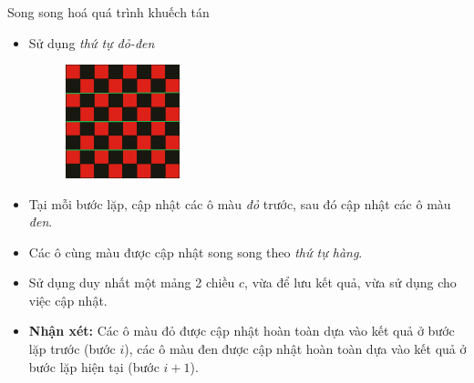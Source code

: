 \begin{frame}{Song song hoá quá trình khuếch tán}
\begin{itemize}
    \item Sử dụng \emph{thứ tự đỏ-đen}
    \begin{figure}[H]
        \centering
        \includegraphics[width=33mm]{img/red-black-grid.png}
    \end{figure}
	\item Tại mỗi bước lặp, cập nhật các ô màu \emph{đỏ} trước, sau đó cập nhật các ô màu \emph{đen}.
	\item Các ô cùng màu được cập nhật song song theo \emph{thứ tự hàng}.
	\item Sử dụng duy nhất một mảng 2 chiều $c$, vừa để lưu kết quả, vừa sử dụng cho việc cập nhật.
	\item \textbf{Nhận xét:} Các ô màu đỏ được cập nhật hoàn toàn dựa vào kết quả ở bước lặp trước (bước $i$), các ô màu đen được cập nhật hoàn toàn dựa vào kết quả ở bước lặp hiện tại (bước $i + 1$).
\end{itemize}
\end{frame}
